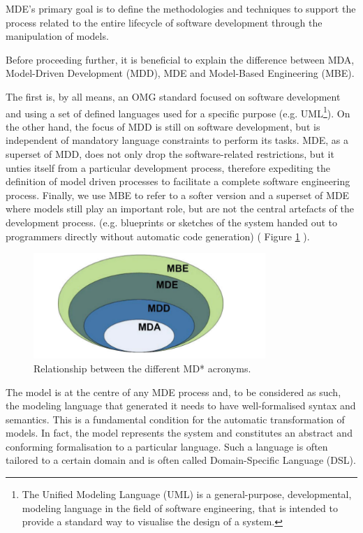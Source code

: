 MDE's primary goal is to define the methodologies and techniques to support the process related to the entire lifecycle of software development through the manipulation of models.

Before proceeding further, it is beneficial to explain the difference between MDA, Model-Driven Development (MDD), MDE and Model-Based Engineering (MBE).

The first is, by all means, an OMG standard focused on software development and using a set of defined languages used for a specific purpose (e.g. UML\footnote{The Unified Modeling Language (UML) is a general-purpose, developmental, modeling language in the field of software engineering, that is intended to provide a standard way to visualise the design of a system.}). On the other hand, the focus of MDD is still on software development, but is independent of mandatory language constraints to perform its tasks.
MDE, as a superset of MDD, does not only drop the software-related restrictions, but it unties itself from a particular development process, therefore expediting the definition of model driven processes to facilitate a complete software engineering process. 
Finally, we use MBE to refer to a softer version and a superset of MDE where models still play an important role, but are not the central artefacts of the development process. (e.g. blueprints or sketches of the system handed out to programmers directly without automatic code generation) ( Figure \ref{fig:mda} ).

\vspace{0cm}
\begin{figure}[htbp]
  \centering
    \includegraphics[height=4cm]{images/mda}
  \caption{Relationship between the different MD* acronyms.}
  \label{fig:mda}
\end{figure}
\vspace{0cm}

The model is at the centre of any MDE process and, to be considered as such, the modeling language that generated it needs to have well-formalised syntax and semantics. This is a fundamental condition for the automatic transformation of models. In fact, the model represents the system and constitutes an abstract and conforming formalisation to a particular language. Such a language is often tailored to a certain domain and is often called Domain-Specific Language (DSL). 

